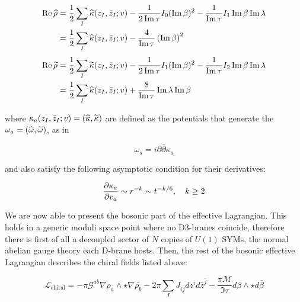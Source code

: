\begin{align}
\begin{split}
	\operatorname{Re} \widehat{\rho} &= \frac{1}{2} \sum_I \widehat{\kappa}(z_I,\bar z_I ; v)  - \frac{1}{2\operatorname{Im} \tau} I_0 (\operatorname{Im} \beta)^2 - \frac{1}{\operatorname{Im} \tau} I_1 \operatorname{Im} \beta \operatorname{Im} \lambda\\
	&= \frac{1}{2} \sum_I \widehat{\kappa}(z_I,\bar z_I; v) -\frac{4}{\operatorname{Im}\tau} \left( \operatorname{Im}\beta \right)^2
	\label{rhofunv}
\end{split}
\end{align}
\begin{align}
\begin{split}
	\operatorname{Re} \widetilde{\rho} &= \frac{1}{2} \sum_I \widetilde{\kappa}(z_I,\bar z_I; v) - \frac{1}{2 \operatorname{Im} \tau}I_1(\operatorname{Im}\beta)^2-\frac{1}{\operatorname{Im}\tau}I_2 \operatorname{Im}\beta \operatorname{Im}\lambda\\
	&= \frac{1}{2} \sum_I \widehat{\kappa}(z_I,\bar z_I; v) + \frac{8}{\operatorname{Im}\tau} \operatorname{Im}\lambda \operatorname{Im}\beta 
	\label{}
\end{split}
\end{align}

where $\kappa_a(z_I,\bar z_I; v) = (\widehat{\kappa},\widetilde{\kappa})$ are defined as the potentials that generate the $\omega_a = (\widehat{\omega}, \widetilde{\omega})$, as in

\begin{equation}
	\omega_a = i \partial\bar \partial \kappa_a
	\label{defkappamain}
\end{equation}

and also satisfy the following asymptotic condition for their derivatives:

\begin{equation}
	\frac{\partial\kappa_a}{\partial v_a} \sim r^{-k} \sim t^{-k/6}, \quad k \geq 2
	\label{potentialcondition}
\end{equation}


We are now able to present the bosonic part of the effective Lagrangian. This holds in a generic moduli space point where no D3-branes coincide, therefore there is first of all a decoupled sector of $N$ copies of $U(1)$ SYMs, the normal abelian gauge theory each D-brane hosts. Then, the rest of the bosonic effective Lagrangian describes the chiral fields listed above:

\begin{equation}
	\mathcal{L}_\mathrm{chiral} = - \pi \mathcal{G}^{ab} \nabla \rho_a \wedge \star \nabla \bar {\rho_b} - 2 \pi \sum_I J_{i\bar j} dz^i d\bar{z}^{\bar j} - \frac{\pi\mathcal{M}}{\Im \tau} d\beta \wedge \star d\bar\beta
	\label{y20lagrangian}
\end{equation}

